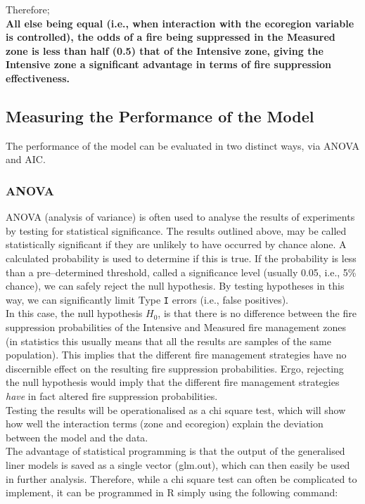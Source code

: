 \begin{spacing}{1.5}
\noindent Therefore; \\
 
\noindent \textbf{All else being equal (i.e., when interaction with the ecoregion variable is controlled), the odds of a fire being suppressed in the Measured zone is less than half (0.5) that of the Intensive zone, giving the Intensive zone a significant advantage in terms of fire suppression effectiveness.}

\subsection{Measuring the Performance of the Model}
The performance of the model can be evaluated in two distinct ways, via ANOVA and AIC.

\subsubsection{ANOVA}
ANOVA (analysis of variance) is often used to analyse the results of experiments by testing for statistical significance. The results outlined above, may be called statistically significant if they are unlikely to have occurred by chance alone. A calculated probability is used to determine if this is true. If the probability is less than a pre--determined threshold, called a significance level (usually 0.05, i.e., 5\% chance), we can safely reject the null hypothesis. By testing hypotheses in this way, we can significantly limit Type \texttt{I} errors (i.e., false positives). \\

\noindent In this case, the null hypothesis $H_{\mathrm{0}}$, is that there is no difference between the fire suppression probabilities of the Intensive and Measured fire management zones (in statistics this usually means that all the results are samples of the same population). This implies that the different fire management strategies have no discernible effect on the resulting fire suppression probabilities. Ergo, rejecting the null hypothesis would imply that the different fire management strategies \emph{have} in fact altered fire suppression probabilities. \\

\noindent Testing the results will be operationalised as a chi square test, which will show how well the interaction terms (zone and ecoregion) explain the deviation between the model and the data. \\

\noindent The advantage of statistical programming is that the output of the generalised liner models is saved as a single vector (glm.out), which can then easily be used in further analysis. Therefore, while a chi square test can often be complicated to implement, it can be programmed in R simply using the following command: \\


\end{spacing}
